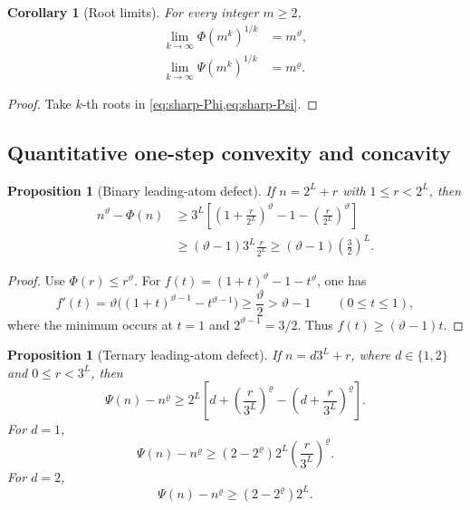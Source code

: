 \documentclass[11pt]{article}
\newtheorem{proposition}[theorem]{Proposition}
\newtheorem{corollary}[theorem]{Corollary}
\theoremstyle{definition}
\begin{document}
\begin{corollary}[Root limits]\label{cor:root-limits}
For every integer \(m\ge2\),
\begin{align}
 \lim_{k\to\infty}\Phi(m^k)^{1/k}&=m^\vartheta,\label{eq:Phi-root}\\
 \lim_{k\to\infty}\Psi(m^k)^{1/k}&=m^\varrho.\label{eq:Psi-root}
\end{align}
\end{corollary}

\begin{proof}
Take \(k\)-th roots in \cref{eq:sharp-Phi,eq:sharp-Psi}.
\end{proof}

\subsection{Quantitative one-step convexity and concavity}

\begin{proposition}[Binary leading-atom defect]\label{prop:binary-defect}
If \(n=2^L+r\) with \(1\le r<2^L\), then
\begin{align}
 n^\vartheta-\Phi(n)
 &\ge3^L\left[
     \left(1+\frac r{2^L}\right)^\vartheta
     -1-\left(\frac r{2^L}\right)^\vartheta
   \right]\label{eq:binary-defect-exact}\\
 &\ge(\vartheta-1)3^L\frac r{2^L}
 \ge(\vartheta-1)\left(\frac32\right)^L.
 \label{eq:binary-defect-linear}
\end{align}
\end{proposition}

\begin{proof}
Use \(\Phi(r)\le r^\vartheta\).  For
\(f(t)=(1+t)^\vartheta-1-t^\vartheta\), one has
\[
 f'(t)=\vartheta\big((1+t)^{\vartheta-1}-t^{\vartheta-1}\big)
 \ge \frac\vartheta2>\vartheta-1
 \qquad(0\le t\le1),
\]
where the minimum occurs at \(t=1\) and
\(2^{\vartheta-1}=3/2\).  Thus \(f(t)\ge(\vartheta-1)t\).
\end{proof}

\begin{proposition}[Ternary leading-atom defect]\label{prop:ternary-defect}
If \(n=d3^L+r\), where \(d\in\{1,2\}\) and \(0\le r<3^L\), then
\begin{equation}\label{eq:ternary-defect-exact}
 \Psi(n)-n^\varrho
 \ge2^L\left[d+
       \left(\frac r{3^L}\right)^\varrho
       -\left(d+\frac r{3^L}\right)^\varrho\right].
\end{equation}
For \(d=1\),
\begin{equation}\label{eq:ternary-defect-d1}
 \Psi(n)-n^\varrho
 \ge(2-2^\varrho)2^L\left(\frac r{3^L}\right)^\varrho.
\end{equation}
For \(d=2\),
\begin{equation}\label{eq:ternary-defect-d2}
 \Psi(n)-n^\varrho\ge(2-2^\varrho)2^L.
\end{equation}
\end{proposition}
\end{document}
